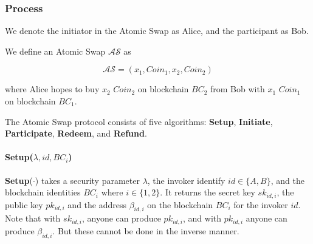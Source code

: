 \subsubsection{Process}

We denote the initiator in the Atomic Swap as Alice, and the participant as Bob.

\begin{definition}
We define an Atomic Swap $\mathcal{AS}$ as

$$\mathcal{AS} = (x_1, Coin_1, x_2, Coin_2)$$

where Alice hopes to buy $x_2$ $Coin_2$ on blockchain $BC_2$ from Bob with $x_1$ $Coin_1$ on blockchain $BC_1$.
\end{definition}

The Atomic Swap protocol consists of five algorithms:
\textbf{Setup},
\textbf{Initiate},
\textbf{Participate},
\textbf{Redeem}, and
\textbf{Refund}.

\paragraph{\textbf{Setup}($\lambda, id, BC_i$)}
\textbf{Setup}($\cdot$) takes a security parameter $\lambda$,
the invoker identify $id \in \{A, B\}$,
and the blockchain identities $BC_i$ where $i \in \{1, 2\}$.
It returns the secret key $sk_{id, i}$, the public key $pk_{id, i}$ and the address $\beta_{id, i}$ on the blockchain $BC_i$ for the invoker $id$.
Note that with $sk_{id, i}$, anyone can produce $pk_{id, i}$, and with $pk_{id, i}$ anyone can produce $\beta_{id, i}$. But these cannot be done in the inverse manner.

